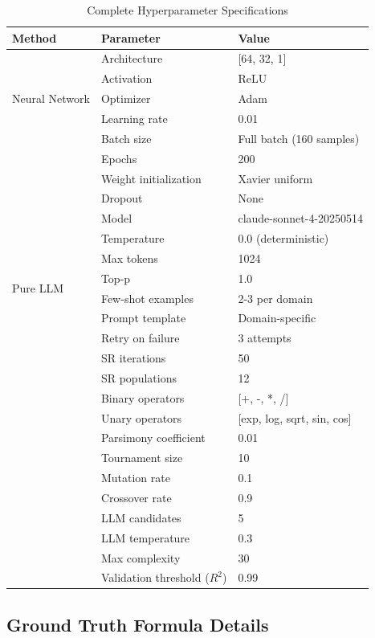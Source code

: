 \begin{table}[htbp]
\centering
\caption{Complete Hyperparameter Specifications}
\label{tab:hyperparameters}
\small
\begin{tabular}{lll}
\toprule
\textbf{Method} & \textbf{Parameter} & \textbf{Value} \\
\midrule
\multirow{5}{*}{Neural Network} 
& Architecture & [64, 32, 1] \\
& Activation & ReLU \\
& Optimizer & Adam \\
& Learning rate & 0.01 \\
& Batch size & Full batch (160 samples) \\
& Epochs & 200 \\
& Weight initialization & Xavier uniform \\
& Dropout & None \\
\midrule
\multirow{8}{*}{Pure LLM}
& Model & claude-sonnet-4-20250514 \\
& Temperature & 0.0 (deterministic) \\
& Max tokens & 1024 \\
& Top-p & 1.0 \\
& Few-shot examples & 2-3 per domain \\
& Prompt template & Domain-specific \\
& Retry on failure & 3 attempts \\
\midrule
\multirow{12}{*}{Hybrid v40}
& SR iterations & 50 \\
& SR populations & 12 \\
& Binary operators & [+, -, *, /] \\
& Unary operators & [exp, log, sqrt, sin, cos] \\
& Parsimony coefficient & 0.01 \\
& Tournament size & 10 \\
& Mutation rate & 0.1 \\
& Crossover rate & 0.9 \\
& LLM candidates & 5 \\
& LLM temperature & 0.3 \\
& Max complexity & 30 \\
& Validation threshold ($R^2$) & 0.99 \\
\bottomrule
\end{tabular}
\end{table}

\subsection{Ground Truth Formula Details}

